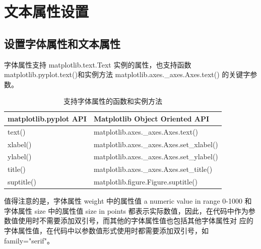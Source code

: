 \chapter{文本属性设置\label{ch11}}
\section{设置字体属性和文本属性}
字体属性支持 matplotlib.text.Text 实例的属性，也支持函数 matplotlib.pyplot.text()和实例方法 matplotlib.axes.\_axes.Axes.text() 的关键字参数。

\begin{table}
    \centering
    \caption{支持字体属性的函数和实例方法}
    \begin{tabular}{ll}
        \hline
        matplotlib.pyplot API & Matplotlib Object Oriented API            \\
        \hline
        text()                & matplotlib.axes.\_axes.Axes.text()        \\
        xlabel()              & matplotlib.axes.\_axes.Axes.set\_xlabel() \\
        ylabel()              & matplotlib.axes.\_axes.Axes.set\_ylabel() \\
        title()               & matplotlib.axes.\_axes.Axes.set\_title()  \\
        suptitle()            & matplotlib.figure.Figure.suptitle()       \\
        \hline
    \end{tabular}
\end{table}

值得注意的是，字体属性 weight 中的属性值 a numeric value in range 0-1000 和字体属性 size 中的属性值 size in points 都表示实际数值，因此，在代码中作为参数值使用时不需要添加双引号，而其他的字体属性值也包括其他字体属性对 应的字体属性值，在代码中以参数值形式使用时都需要添加双引号，如 family="serif"。

